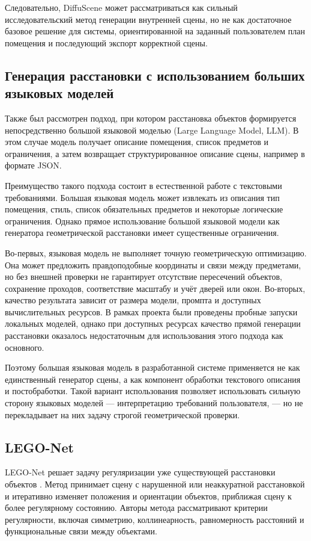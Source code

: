 \documentclass[times]{itmo-student-thesis}
\begin{document}
Следовательно, DiffuScene может рассматриваться как сильный исследовательский метод генерации внутренней сцены, но не как достаточное базовое решение для системы, ориентированной на заданный пользователем план помещения и последующий экспорт корректной сцены.

\subsection{Генерация расстановки с использованием больших языковых моделей}

Также был рассмотрен подход, при котором расстановка объектов формируется непосредственно большой языковой моделью (Large Language Model, LLM). В этом случае модель получает описание помещения, список предметов и ограничения, а затем возвращает структурированное описание сцены, например в формате JSON.

Преимущество такого подхода состоит в естественной работе с текстовыми требованиями. Большая языковая модель может извлекать из описания тип помещения, стиль, список обязательных предметов и некоторые логические ограничения. Однако прямое использование большой языковой модели как генератора геометрической расстановки имеет существенные ограничения.

Во-первых, языковая модель не выполняет точную геометрическую оптимизацию. Она может предложить правдоподобные координаты и связи между предметами, но без внешней проверки не гарантирует отсутствие пересечений объектов, сохранение проходов, соответствие масштабу и учёт дверей или окон. Во-вторых, качество результата зависит от размера модели, промпта и доступных вычислительных ресурсов. В рамках проекта были проведены пробные запуски локальных моделей, однако при доступных ресурсах качество прямой генерации расстановки оказалось недостаточным для использования этого подхода как основного.

Поэтому большая языковая модель в разработанной системе применяется не как единственный генератор сцены, а как компонент обработки текстового описания и постобработки. Такой вариант использования позволяет использовать сильную сторону языковых моделей — интерпретацию требований пользователя, — но не перекладывает на них задачу строгой геометрической проверки.

\subsection{LEGO-Net}

LEGO-Net решает задачу регуляризации уже существующей расстановки объектов \cite{wei2023legonet}. Метод принимает сцену с нарушенной или неаккуратной расстановкой и итеративно изменяет положения и ориентации объектов, приближая сцену к более регулярному состоянию. Авторы метода рассматривают критерии регулярности, включая симметрию, коллинеарность, равномерность расстояний и функциональные связи между объектами.
\end{document}
